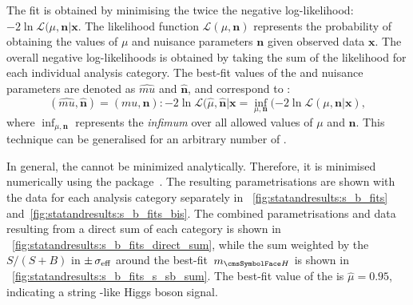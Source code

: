 The fit is obtained by minimising the twice the negative log-likelihood: $ -2 \ln \mathcal{L}(\mu,\mathbf{n}| \mathbf{x}$. The likelihood function $\mathcal{L}(\mu,\mathbf{n})$ represents the probability of obtaining the values of \POI $\mu$ and nuisance parameters $\mathbf{n}$ given observed data $\mathbf{x}$. The overall negative log-likelihoods is obtained by taking the sum of the likelihood for each individual analysis category.
The best-fit values of the \POI and nuisance parameters are denoted as $\hat{mu}$ and $\hat{\mathbf{n}}$, and correspond to :
\begin{equation}
(\hat{mu}, \hat{\mathbf{n}}) = { (mu,\mathbf{n}) : -2 \ln \mathcal{L}(\hat{\mu},\hat{\mathbf{n}}| \mathbf{x} = \inf _{\mu,\mathbf{n}}(-2 \ln \mathcal{L}(\mu,\mathbf{n}| \mathbf{x}) },
\end{equation}
where $\inf_{ \mu,\mathbf{n}}$ represents the \emph{infimum} over all allowed values of $\mu$ and $\mathbf{n}$. This technique can be generalised for an arbitrary number of \POI\s. 

In general, the \NLL cannot be minimized analytically. Therefore, it is minimised numerically using the \Minuit package~\cite{}. The resulting parametrisations are shown with the data for each analysis category separately in \Fig\s~\ref{fig:statandresults:s_b_fits} and~\ref{fig:statandresults:s_b_fits_bis}. The combined parametrisations and data  resulting from a direct sum of each category is shown in \Fig~\ref{fig:statandresults:s_b_fits_direct_sum}, while the sum weighted by the $S/(S+B)$ in $\pm \,\sigma_{\text{eff}}$ around the best-fit $\mH$ is shown in \Fig~\ref{fig:statandresults:s_b_fits_s_sb_sum}. The best-fit value of the \POI \mu is $\hat{\mu}= 0.95$, indicating a string \SM-like Higgs boson signal. 


